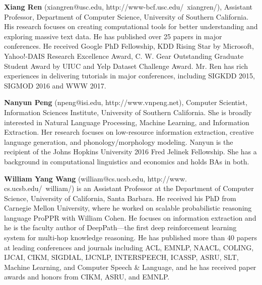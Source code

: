   {\bfseries Xiang Ren} (xiangren@usc.edu, http://www-bcf.usc.edu/~xiangren/), Assistant Professor, Department of Computer Science, University of Southern California. His research focuses on creating computational tools for better understanding and exploring massive text data. He has published over 25 papers in major conferences. He received Google PhD Fellowship, KDD Rising Star by Microsoft, Yahoo!-DAIS Research Excellence Award, C. W. Gear Outstanding Graduate Student Award by UIUC and Yelp Dataset Challenge Award. Mr. Ren has rich experiences in delivering tutorials in major conferences, including SIGKDD 2015, SIGMOD 2016 and WWW 2017. 

  {\bfseries Nanyun Peng} (npeng@isi.edu, http://www.vnpeng.net), Computer Scientist, Information Sciences Institute, University of Southern California. She is broadly interested in Natural Language Processing, Machine Learning, and Information Extraction. Her research focuses on low-resource information extraction, creative language generation, and phonology/morphology modeling. Nanyun is the recipient of the Johns Hopkins University 2016 Fred Jelinek Fellowship. She has a background in computational linguistics and economics and holds BAs in both.

  {\bfseries William Yang Wang} (william@cs.ucsb.edu, http://www. cs.ucsb.edu/~william/) is an Assistant Professor at the Department of Computer Science, University of California, Santa Barbara. He received his PhD from Carnegie Mellon University, where he worked on scalable probabilistic reasoning language ProPPR with William Cohen. He focuses on information extraction and he is the faculty author of DeepPath—the first deep reinforcement learning system for multi-hop knowledge reasoning. He has published more than 40 papers at leading conferences and journals including ACL, EMNLP, NAACL, COLING, IJCAI, CIKM, SIGDIAL, IJCNLP, INTERSPEECH, ICASSP, ASRU, SLT, Machine Learning, and Computer Speech \& Language, and he has received paper awards and honors from CIKM, ASRU, and EMNLP.
  